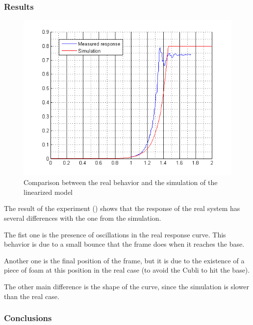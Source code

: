 \subsubsection{Results}
\begin{figure}[H] 
	\centering 
	\includegraphics[scale=0.9]{figures/comparisonRealModel}
	\caption{Comparison between the real behavior and the simulation of the linearized model}
	\label{comparisonRealModel}
\end{figure} 

The result of the experiment () shows that the response of the real system has several differences with the one from the simulation.

The fist one is the presence of oscillations in the real response curve. This behavior is due to a small bounce that the frame does when it reaches the base.

Another one is the final position of the frame, but it is due to the existence of a piece of foam at this position in the real case (to avoid the Cubli to hit the base).

The other main difference is the shape of the curve, since the simulation is slower than the real case.

\subsubsection{Conclusions}

